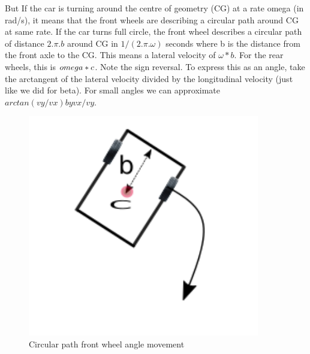 \documentclass{book}
\begin{document}
\begin{equation}
   [ \beta = arctan(v_{y}/v_{x})]
\end{equation}
But If the car is turning around the centre of geometry (CG) at a rate omega (in rad/s), it means that the front wheels are describing a circular path around CG at same rate. If the car turns full circle, the front wheel describes a circular path of distance $ 2.\pi.b $ around CG in $ 1/(2.\pi.\omega)$ seconds where b is the distance from the front axle to the CG. This means a lateral velocity of $ \omega * b $. For the rear wheels, this is $\-omega * c $. Note the sign reversal. To express this as an angle, take the arctangent of the lateral velocity divided by the longitudinal velocity (just like we did for beta).  For small angles we can approximate $ arctan(vy/vx) by vx/vy $.
\begin{figure}[htbp]
  \centering
  \includegraphics[width=0.9\textwidth]{circularpathfront}
  \caption{Circular path front wheel angle movement}
\end{figure}
\end{document}
